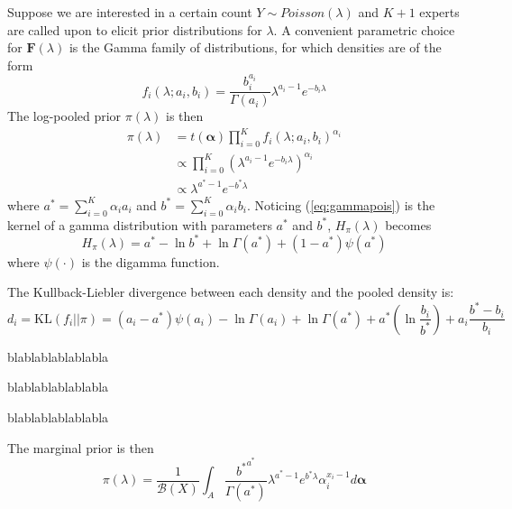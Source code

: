 \documentclass[a4paper, notitlepage, 10pt]{article}
\begin{document}
Suppose we are interested in a certain count $Y\sim Poisson(\lambda)$ and $K + 1$ experts are called upon to elicit prior distributions for $\lambda$.
A convenient parametric choice for $\mathbf{F}(\lambda)$ is the Gamma family of distributions, for which densities are of the form
$$ f_i(\lambda;a_i,b_i) = \frac{b_i^{a_i}}{\Gamma(a_i)} \lambda^{a_i-1} e^{-b_i\lambda}$$
The log-pooled prior $\pi(\lambda)$ is then
\begin{align}
\pi(\lambda)&= t(\boldsymbol\alpha)\prod_{i=0}^{K}f_i(\lambda;a_i,b_i)^{\alpha_i}\\
&\propto \prod_{i=0}^{K} \left(\lambda^{a_i-1} e^{-b_i\lambda}\right)^{\alpha_i}\\
\label{eq:gammapois}
&\propto \lambda^{a^*-1} e^{-b^*\lambda}
\end{align}
where $a^* =\sum_{i=0}^{K}\alpha_ia_i$ and $b^* = \sum_{i=0}^{K}\alpha_ib_i$.
Noticing (\ref{eq:gammapois}) is the kernel of a gamma distribution with parameters $a^*$ and $b^*$, $H_{\pi}(\lambda)$ becomes
\begin{equation}
\label{eq:entropygamma}
H_{\pi}(\lambda) = a^* - \ln b^* + \ln \Gamma(a^*) + (1-a^*)\psi(a^*)
\end{equation}
where $\psi(\cdot)$ is the digamma function.

The Kullback-Liebler divergence between each density and the pooled density is:
\begin{equation}
 \label{eq:KLgamma}
 d_i = \text{KL}(f_i||\pi) = (a_i-a^*)\psi(a_i) - \ln\Gamma(a_i) + \ln\Gamma(a^*) + a^*(\ln\frac{b_i}{b^*}) + a_i\frac{b^*-b_i}{b_i}
\end{equation}

blablablablablabla

blablablablablabla

blablablablablabla

The marginal prior is then
\begin{equation}
\label{eq:marginalgamma}
\pi(\lambda) = \frac{1}{\mathcal{B}(X)}\int_{A} \frac{{b^*}^{a^*}}{\Gamma(a^*)}\lambda^{a^* - 1} e^{b^*\lambda} \alpha_i^{x_i-1}d\boldsymbol\alpha 
\end{equation}
\end{document}

